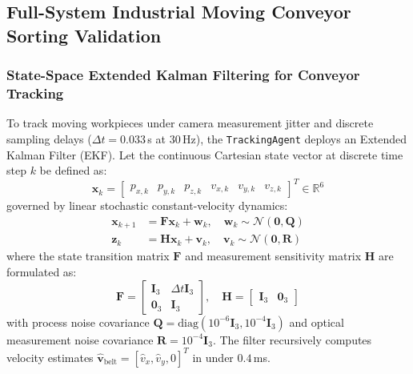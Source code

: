 \documentclass[journal]{IEEEtran}
\begin{document}
\subsection{Full-System Industrial Moving Conveyor Sorting Validation}
\subsubsection{State-Space Extended Kalman Filtering for Conveyor Tracking}
To track moving workpieces under camera measurement jitter and discrete sampling delays ($\Delta t = 0.033$\,s at $30$\,Hz), the \texttt{TrackingAgent} deploys an Extended Kalman Filter (EKF). Let the continuous Cartesian state vector at discrete time step $k$ be defined as:
\begin{equation}
\label{eq:ekf_state}
\mathbf{x}_k = \begin{bmatrix} p_{x,k} & p_{y,k} & p_{z,k} & v_{x,k} & v_{y,k} & v_{z,k} \end{bmatrix}^T \in \mathbb{R}^6
\end{equation}
governed by linear stochastic constant-velocity dynamics:
\begin{align}
\label{eq:ekf_dyn}
\mathbf{x}_{k+1} &= \mathbf{F} \mathbf{x}_k + \mathbf{w}_k, \quad \mathbf{w}_k \sim \mathcal{N}(\mathbf{0}, \mathbf{Q}) \\
\label{eq:ekf_meas}
\mathbf{z}_k &= \mathbf{H} \mathbf{x}_k + \mathbf{v}_k, \quad \mathbf{v}_k \sim \mathcal{N}(\mathbf{0}, \mathbf{R})
\end{align}
where the state transition matrix $\mathbf{F}$ and measurement sensitivity matrix $\mathbf{H}$ are formulated as:
\begin{equation}
\mathbf{F} = \begin{bmatrix} \mathbf{I}_3 & \Delta t \mathbf{I}_3 \\ \mathbf{0}_3 & \mathbf{I}_3 \end{bmatrix}, \quad \mathbf{H} = \begin{bmatrix} \mathbf{I}_3 & \mathbf{0}_3 \end{bmatrix}
\end{equation}
with process noise covariance $\mathbf{Q} = \text{diag}(10^{-6}\mathbf{I}_3, 10^{-4}\mathbf{I}_3)$ and optical measurement noise covariance $\mathbf{R} = 10^{-4}\mathbf{I}_3$. The filter recursively computes velocity estimates $\hat{\mathbf{v}}_{\text{belt}} = [\hat{v}_{x}, \hat{v}_{y}, 0]^T$ in under $0.4$\,ms.
\end{document}
